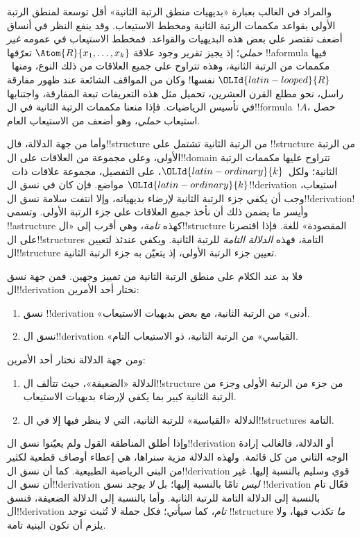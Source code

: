 \documentclass[../../../include/open-logic-section]{subfiles}
\begin{document}
والمراد في الغالب بعبارة «بديهيات منطق الرتبة الثانية» أقل
توسعة لمنطق الرتبة الأولى بقواعد مكممات الرتبة الثانية ومخطط
الاستيعاب. وقد ينفع النظر في أنساق أضعف تقتصر على بعض هذه
البديهيات والقواعد. فمخطط الاستيعاب في عمومه \emph{غير حملي}؛
إذ يجيز تقرير وجود علاقة $\Atom{R}{x_1, \dots, x_k}$ تعرّفها
!!a{formula} فيها مكممات من الرتبة الثانية، وهذه تتراوح على
جميع العلاقات من ذلك النوع، ومنها~${\OLId{latin-looped}{R}}$ نفسها!{} وكان من
المواقف الشائعة عند ظهور مفارقة راسل، نحو مطلع القرن العشرين،
تحميل مثل هذه التعريفات تبعة المفارقة، واجتنابها في تأسيس
الرياضيات. فإذا منعنا مكممات الرتبة الثانية في
ال!!{formula}~$!A$، حصل استيعاب {\em حملي}، وهو أضعف من
الاستيعاب العام.

وأما من جهة الدلالة، فال!!{structure} من الرتبة الثانية
تشتمل على !!{structure} من الرتبة الأولى، وعلى مجموعة من
العلاقات على ال!!{domain} تتراوح عليها مكممات الرتبة الثانية؛
ولكل~${\OLId{latin-ordinary}{k}}$، على التفصيل، مجموعة علاقات ذات~${\OLId{latin-ordinary}{k}}$ مواضع.
فإن كان في نسق ال!!{derivation} استيعاب، وجب أن يكفي جزء
الرتبة الثانية لإرضاء بديهياته، وإلا انتفت سلامة نسق
ال!!{derivation}!{} وأيسر ما يضمن ذلك أن نأخذ
\emph{جميع} العلاقات على جزء الرتبة الأولى. وتسمى
!!a{structure} كهذه \emph{تامة}، وهي أقرب إلى
«ال!!{structure} المقصودة» للغة. فإذا اقتصرنا على
ال!!{structure}s التامة، فهذه \emph{الدلالة التامة} للرتبة
الثانية. ويكفي عندئذ لتعيين ال!!{structure} تعيين جزء الرتبة
الأولى، إذ يتعيّن به جزء الرتبة الثانية.

فلا بد عند الكلام على منطق الرتبة الثانية من تمييز وجهين.
فمن جهة نسق ال!!{derivation} نختار أحد الأمرين:
\begin{enumerate}
\item نسق !!{derivation} «أدنى» من الرتبة الثانية، مع بعض بديهيات
  الاستيعاب.
\item نسق ال!!{derivation} «القياسي» من الرتبة الثانية، ذو الاستيعاب
  التام.
\end{enumerate}
ومن جهة الدلالة نختار أحد الأمرين:
\begin{enumerate}
\item الدلالة «الضعيفة»، حيث تتألف ال!!{structure} من جزء من الرتبة
  الأولى وجزء من الرتبة الثانية كبير بما يكفي لإرضاء بديهيات
  الاستيعاب.
\item الدلالة «القياسية» للرتبة الثانية، التي لا ينظر فيها إلا في
  ال!!{structure}s التامة.
\end{enumerate}
وإذا أطلق المناطقة القول ولم يعيّنوا نسق ال!!{derivation}
أو الدلالة، فالغالب إرادة الوجه الثاني من كل قائمة. ولهذه
الدلالة مزية سنراها، هي إعطاء أوصاف قطعية لكثير من البنى
الرياضية الطبيعية. كما أن نسق ال!!{derivation} قوي وسليم
بالنسبة إليها. غير أن نسق ال!!{derivation} \emph{ليس} تامًا
بالنسبة إليها؛ بل \emph{لا يوجد} نسق !!{derivation} فعّال تام
بالنسبة إلى الدلالة التامة للرتبة الثانية. وأما بالنسبة إلى
الدلالة الضعيفة، فنسق ال!!{derivation} \emph{تام}، كما سيأتي؛
فكل جملة لا تُثبت توجد !!{structure} \emph{ما} تكذب فيها،
ولا يلزم أن تكون البنية تامة.
\end{document}
